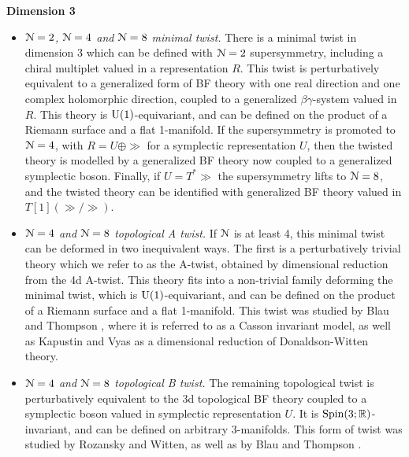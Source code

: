 \documentclass[10pt, oneside]{article}
\begin{document}
\textbf{Dimension 3}
\begin{itemize}
 \item \emph{$\mathcal{N}=2$, $\mathcal{N}=4$ and $\mathcal{N}=8$ minimal twist.} There is a minimal twist in dimension 3 which can be defined with $\mathcal{N}=2$ supersymmetry, including a chiral multiplet valued in a representation $R$.  This twist is perturbatively equivalent to a generalized form of BF theory with one real direction and one complex holomorphic direction, coupled to a generalized $\beta \gamma$-system valued in $R$.  This theory is $\mathrm{U}(1)$-equivariant, and can be defined on the product of a Riemann surface and a flat 1-manifold.  If the supersymmetry is promoted to $\mathcal{N}=4$, with $R = U \oplus \gg$ for a symplectic representation $U$, then the twisted theory is modelled by a generalized BF theory now coupled to a generalized symplectic boson.  Finally, if $U = T^*\gg$ the supersymmetry lifts to $\mathcal{N}=8$, and the twisted theory can be identified with generalized BF theory valued in $T[1](\gg/\gg)$.
 \item \emph{$\mathcal{N}=4$ and $\mathcal{N}=8$ topological A twist.} If $\mathcal{N}$ is at least 4, this minimal twist can be deformed in two inequivalent ways.  The first is a perturbatively trivial theory which we refer to as the A-twist, obtained by dimensional reduction from the 4d A-twist.  This theory fits into a non-trivial family deforming the minimal twist, which is $\mathrm{U}(1)$-equivariant, and can be defined on the product of a Riemann surface and a flat 1-manifold.  This twist was studied by Blau and Thompson \cite{BlauThompson1}, where it is referred to as a Casson invariant model, as well as Kapustin and Vyas \cite{KapustinVyas} as a dimensional reduction of Donaldson-Witten theory.
 \item \emph{$\mathcal{N}=4$ and $\mathcal{N}=8$ topological B twist.} The remaining topological twist is perturbatively equivalent to the 3d topological BF theory coupled to a symplectic boson valued in symplectic representation $U$.  It is $\mathrm{Spin}(3;\mathbb R)$-invariant, and can be defined on arbitrary 3-manifolds. This form of twist was studied by Rozansky and Witten, \cite{RozanskyWitten} as well as by Blau and Thompson \cite{BlauThompson2}.
\end{itemize}
\end{document}
